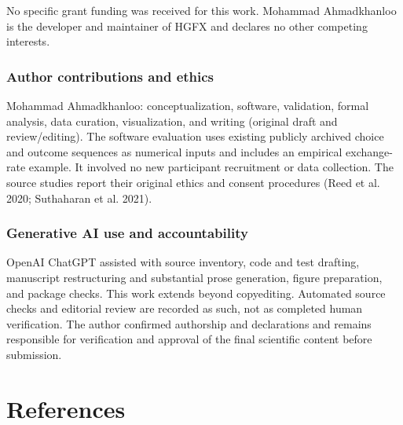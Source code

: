 \documentclass[
  11pt,
]{article}
\begin{document}
No specific grant funding was received for this work. Mohammad
Ahmadkhanloo is the developer and maintainer of HGFX and declares no
other competing interests.

\subsubsection{Author contributions and
ethics}\label{author-contributions-and-ethics}

Mohammad Ahmadkhanloo: conceptualization, software, validation, formal
analysis, data curation, visualization, and writing (original draft and
review/editing). The software evaluation uses existing publicly archived
choice and outcome sequences as numerical inputs and includes an
empirical exchange-rate example. It involved no new participant
recruitment or data collection. The source studies report their original
ethics and consent procedures (Reed et al. 2020; Suthaharan et al.
2021).

\subsubsection{Generative AI use and
accountability}\label{generative-ai-use-and-accountability}

OpenAI ChatGPT assisted with source inventory, code and test drafting,
manuscript restructuring and substantial prose generation, figure
preparation, and package checks. This work extends beyond copyediting.
Automated source checks and editorial review are recorded as such, not
as completed human verification. The author confirmed authorship and
declarations and remains responsible for verification and approval of
the final scientific content before submission.

\section*{References}\label{bibliography}
\end{document}
